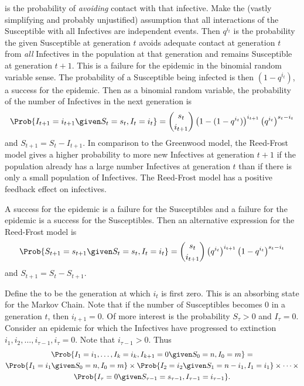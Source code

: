 \documentclass[12pt]{article}
\begin{document}
is the probability of \emph{avoiding} contact with that infective.  Make
the (vastly simplifying and probably unjustified) assumption that all
interactions of the Susceptible with all Infectives are independent
events.  Then \( q^{i_t} \) is the probability the given Susceptible at
generation \( t \) avoids adequate contact at generation \( t \) from
\emph{all} Infectives in the population at that generation and remains
Susceptible at generation \( t + 1 \).  This is a failure for the
epidemic in the binomial random variable sense.  The probability of a
Susceptible being infected is then \( (1 - q^{i_t}) \), a success for
the epidemic.  Then as a binomial random variable, the probability of
the number of Infectives in the next generation is
\[
    \Prob{I_{t+1} = i_{t+1} \given S_t=s_t, I_t=i_t} = \binom{s_t}{i_{t+1}}
    \left(1 - (1-q^{i_t})\right)^{ i_{t+1}}\left(q^{i_t}\right)^{s_t-i_t}
\] and \( S_{t+1} = S_t - I_{t+1} \).  In comparison to the Greenwood
model, the Reed-Frost model gives a higher probability to more new
Infectives at generation \( t+1 \) if the population already has a large
number Infectives at generation \( t \) than if there is only a small
population of Infectives.  The Reed-Frost model has a positive feedback
effect on infectives.

A success for the epidemic is a failure for the Susceptibles and a
failure for the epidemic is a success for the Susceptibles.  Then an
alternative expression for the Reed-Frost model is
\[
    \Prob{S_{t+1} = s_{t+1} \given S_t=s_t, I_t=i_t} = \binom{s_t}{i_{t+1}}
    \left( q^{i_t}\right)^{i_{t+1}}\left(1 - q^{i_t}\right)^{s_t-i_t}
\] and \( S_{t+1} = S_t - S_{t+1} \).

Define the %
to be the generation at which \( i_t \) is first zero.  This is an
absorbing state for the Markov Chain.  Note that if the number of
Susceptibles becomes \( 0 \) in a generation \( t \), then \( i_{t+1} =
0 \).  Of more interest is the probability \( S_{\tau} > 0 \) and \( I_{\tau}
= 0 \).  Consider an epidemic for which the Infectives have progressed
to extinction \( i_1, i_2, \ldots, i_{\tau-1}, i_{\tau} = 0 \).  Note
that \( i_{\tau - 1} > 0 \).  Thus
\begin{multline*}
    \Prob{I_1 =i_1, \ldots, I_{k}=i_k, I_{k+1}=0 \given S_0=n, I_0=m} =
    \\
    \Prob{I_1=i_1 \given S_0=n, I_0=m}\times \Prob{I_2=i_2 \given S_1=n-i_1,
    I_1=i_1}\times\cdots\times \\
    \Prob{I_{\tau}=0 \given S_{\tau - 1}=s_{\tau - 1}, I_{\tau - 1}=i_{\tau
    - 1}}.
\end{multline*}
\end{document}
